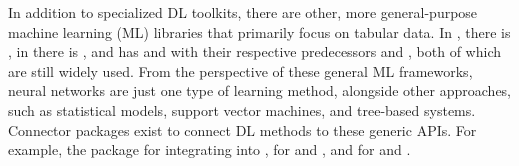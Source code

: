 \documentclass[article]{jss}
\theoremstyle{definition}
\begin{document}
In addition to specialized DL toolkits, there are other, more general-purpose machine learning (ML) libraries that primarily focus on tabular data.
In \python, there is \sklearn{} \citep{ref-pedregosa2011scikit-learn}, in \julia{} there is \mlj{} \citep{ref-blaom2020mlj}, and \rlang{} has \tidymodels{} \citep{ref-kuhn2020tidymodels} and  \citep{ref-mlr32019} with their respective predecessors  \citep{ref-kuhn2021caret} and  \citep{ref-bischl2016mlr}, both of which are still widely used.
From the perspective of these general ML frameworks, neural networks are just one type of learning method, alongside other approaches, such as statistical models, support vector machines, and tree-based systems.
Connector packages exist to connect DL methods to these generic APIs.
For example, the  package \citep{ref-skorch} for integrating \pytorch{} into \sklearn{},  \citep{ref-MLJFlux} for \flux{} and \mlj{}, and  \citep{ref-brulee2025} for \torch{} and \tidymodels{}.
\end{document}
